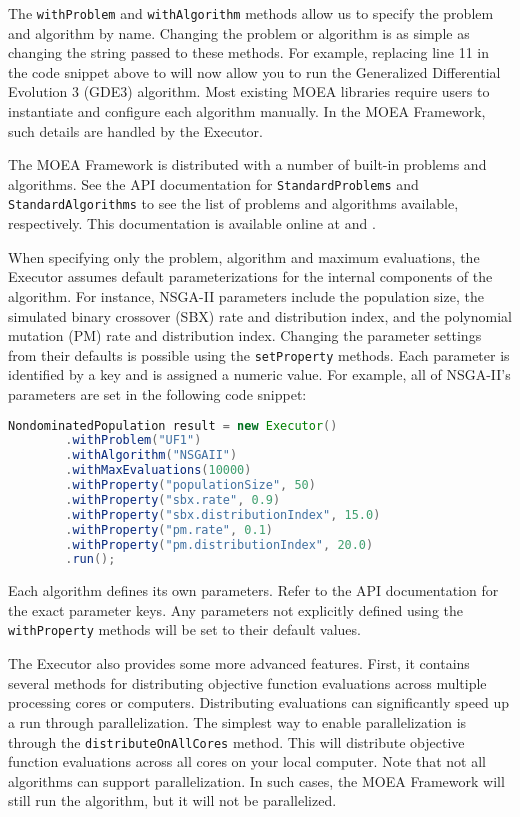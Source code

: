 The \texttt{withProblem} and \texttt{withAlgorithm} methods allow us to specify the problem and algorithm by name.  Changing the problem or algorithm is as simple as changing the string passed to these methods.  For example, replacing line 11 in the code snippet above to  will now allow you to run the Generalized Differential Evolution 3 (GDE3) algorithm.  Most existing MOEA libraries require users to instantiate and configure each algorithm manually.  In the MOEA Framework, such details are handled by the Executor.

The MOEA Framework is distributed with a number of built-in problems and algorithms.  See the API documentation for \texttt{StandardProblems} and \texttt{StandardAlgorithms} to see the list of problems and algorithms available, respectively.  This documentation is available online at  and .

When specifying only the problem, algorithm and maximum evaluations, the Executor assumes default parameterizations for the internal components of the algorithm.  For instance, NSGA-II parameters include the population size, the simulated binary crossover (SBX) rate and distribution index, and the polynomial mutation (PM) rate and distribution index.  Changing the parameter settings from their defaults is possible using the \texttt{setProperty} methods.  Each parameter is identified by a key and is assigned a numeric value.  For example, all of NSGA-II's parameters are set in the following code snippet:

\begin{lstlisting}[language=Java]
NondominatedPopulation result = new Executor()
		.withProblem("UF1")
		.withAlgorithm("NSGAII")
		.withMaxEvaluations(10000)
		.withProperty("populationSize", 50)
		.withProperty("sbx.rate", 0.9)
		.withProperty("sbx.distributionIndex", 15.0)
		.withProperty("pm.rate", 0.1)
		.withProperty("pm.distributionIndex", 20.0)
		.run();
\end{lstlisting}

Each algorithm defines its own parameters.  Refer to the API documentation for the exact parameter keys.  Any parameters not explicitly defined using the \texttt{withProperty} methods will be set to their default values.

The Executor also provides some more advanced features.  First, it contains several methods for distributing objective function evaluations across multiple processing cores or computers.  Distributing evaluations can significantly speed up a run through parallelization.  The simplest way to enable parallelization is through the \texttt{distributeOnAllCores} method.  This will distribute objective function evaluations across all cores on your local computer.  Note that not all algorithms can support parallelization.  In such cases, the MOEA Framework will still run the algorithm, but it will not be parallelized.

